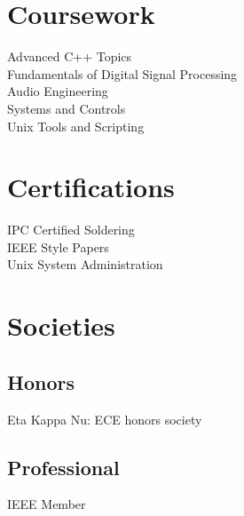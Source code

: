 \documentclass[a4paper]{deedy-resume-openfont} %
\begin{document}
\begin{minipage}[t]{0.33\textwidth}
\sectionspace %


\section{Coursework}

Advanced C++ Topics \\
Fundamentals of Digital Signal Processing \\
Audio Engineering \\
 Systems and Controls\\
Unix Tools and Scripting

\section{Certifications}
IPC Certified Soldering \\
IEEE Style Papers \\
Unix System  Administration

\section{Societies}
\subsection{Honors}
 Eta Kappa Nu: ECE honors society \\
\subsection{Professional}
IEEE Member

\sectionspace %

\end{minipage} %
\hfill
%
%
\end{document}

